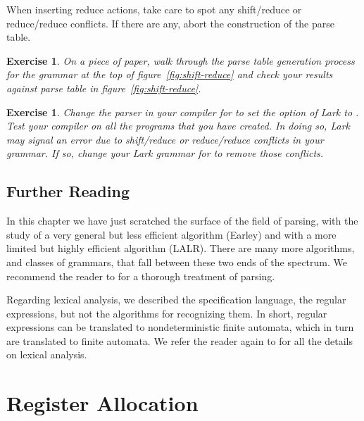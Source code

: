 \documentclass[7x10]{TimesAPriori_MIT}%
\newtheorem{exercise}[theorem]{Exercise}
\numberwithin{theorem}{chapter}
\numberwithin{definition}{chapter}
\numberwithin{equation}{chapter}
\begin{document}
{When inserting reduce actions, take care to spot any shift/reduce or
reduce/reduce conflicts. If there are any, abort the construction of
the parse table.


\begin{exercise}
  \normalfont\normalsize
%
On a piece of paper, walk through the parse table generation process
for the grammar at the top of figure~\ref{fig:shift-reduce} and check
your results against parse table in figure~\ref{fig:shift-reduce}.
\end{exercise}


\begin{exercise}
  \normalfont\normalsize
%
  Change the parser in your compiler for \LangVar{} to set the
   option of Lark to . Test your compiler on
  all the \LangVar{} programs that you have created. In doing so, Lark
  may signal an error due to shift/reduce or reduce/reduce conflicts
  in your grammar. If so, change your Lark grammar for \LangVar{} to
  remove those conflicts.
\end{exercise}


\section{Further Reading}

In this chapter we have just scratched the surface of the field of
parsing, with the study of a very general but less efficient algorithm
(Earley) and with a more limited but highly efficient algorithm
(LALR). There are many more algorithms, and classes of grammars, that
fall between these two ends of the spectrum. We recommend the reader
to \citet{Aho:2006wb} for a thorough treatment of parsing.

Regarding lexical analysis, we described the specification language,
the regular expressions, but not the algorithms for recognizing them.
In short, regular expressions can be translated to nondeterministic
finite automata, which in turn are translated to finite automata.  We
refer the reader again to \citet{Aho:2006wb} for all the details on
lexical analysis.

\fi}

\chapter{Register Allocation}
\label{ch:register-allocation-Lvar}
\setcounter{footnote}{0}
\end{document}
